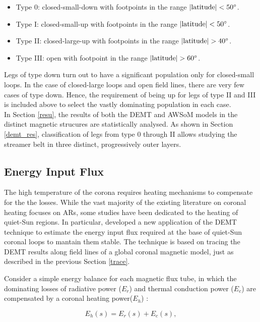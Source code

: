 \documentclass[namedreferences]{solarphysics}
\newcommand{\mdeg}{^\circ}
\begin{document}
\begin{article}
\begin{itemize}
\item Type 0: closed-small-down with footpoints in the range $|{\rm latitude}|<50\mdeg$. 
\item Type I: closed-small-up with footpoints in the range $|{\rm latitude}|<50\mdeg$. 
\item Type II: closed-large-up with footpoints in the range $|{\rm latitude}|>40\mdeg$. 
\item Type III: open with footpoint in the range $|{\rm latitude}|>60\mdeg$.
\end{itemize}

{Legs of type down turn out to have a significant population only for closed-small loops. In the case of closed-large loops and open field lines, there are very few cases of type down. Hence, the requirement of being up for legs of type II and III is included above to select the vastly dominating population in each case}. \\
In Section \ref{resu}, the results of both the DEMT and AWSoM models in the distinct magnetic strucures are statistically analysed. {As shown in Section \ref{demt_res}, classification of legs from type 0 through II allows studying the streamer belt in three distinct, progressively outer layers.}

\subsection{{Energy Input Flux}}\label{energia} 

{The high temperature of the corona requires heating mechanisms to compensate for the the losses. While the vast majority of the existing literature on coronal heating focuses on ARs, some studies have been dedicated to the heating of quiet-Sun regions. In particular,  \citet{maccormack_2017} developed a new application of the DEMT technique to estimate the energy input flux required at the base of quiet-Sun coronal loops to mantain them stable. The technique is based on tracing the DEMT results along field lines of a global coronal magnetic model, just as described in the previous Section \ref{trace}.}

{Consider} a simple energy balance for each magnetic flux tube, {in which the dominating losses of} radiative power ($E_r$) and thermal conduction power ($E_c$) are compensated {by a} coronal heating power($E_h$) \citep{aschwanden_2004}:

\begin{equation}\label{Balance}
E_h(s) = E_r(s)+ E_c(s),
\end{equation}


\end{article}
\end{document}
